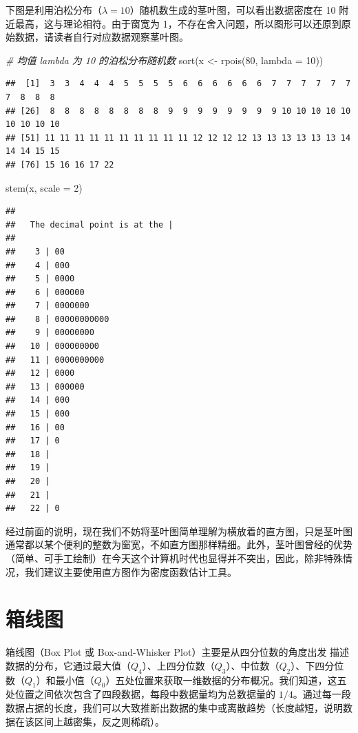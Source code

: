 \documentclass[
  b5paper,
  UTF8,twoside]{book}
\newenvironment{Shaded}{\begin{snugshade}}{\end{snugshade}}
\newcommand{\AttributeTok}[1]{\textcolor[rgb]{0.77,0.63,0.00}{#1}}
\newcommand{\CommentTok}[1]{\textcolor[rgb]{0.56,0.35,0.01}{\textit{#1}}}
\newcommand{\DecValTok}[1]{\textcolor[rgb]{0.00,0.00,0.81}{#1}}
\newcommand{\FunctionTok}[1]{\textcolor[rgb]{0.00,0.00,0.00}{#1}}
\newcommand{\NormalTok}[1]{#1}
\newcommand{\OtherTok}[1]{\textcolor[rgb]{0.56,0.35,0.01}{#1}}
\begin{document}
下图是利用泊松分布（\(\lambda=10\)）随机数生成的茎叶图，可以看出数据密度在 10 附近最高，这与理论相符。由于窗宽为 1，不存在舍入问题，所以图形可以还原到原始数据，请读者自行对应数据观察茎叶图。

\begin{Shaded}
\begin{Highlighting}[]
\CommentTok{\# 均值 lambda 为 10 的泊松分布随机数}
\FunctionTok{sort}\NormalTok{(x }\OtherTok{\textless{}{-}} \FunctionTok{rpois}\NormalTok{(}\DecValTok{80}\NormalTok{, }\AttributeTok{lambda =} \DecValTok{10}\NormalTok{))}
\end{Highlighting}
\end{Shaded}

\begin{verbatim}
##  [1]  3  3  4  4  4  5  5  5  5  6  6  6  6  6  6  7  7  7  7  7  7  7  8  8  8
## [26]  8  8  8  8  8  8  8  8  9  9  9  9  9  9  9  9 10 10 10 10 10 10 10 10 10
## [51] 11 11 11 11 11 11 11 11 11 11 12 12 12 12 13 13 13 13 13 13 14 14 14 15 15
## [76] 15 16 16 17 22
\end{verbatim}

\begin{Shaded}
\begin{Highlighting}[]
\FunctionTok{stem}\NormalTok{(x, }\AttributeTok{scale =} \DecValTok{2}\NormalTok{)}
\end{Highlighting}
\end{Shaded}

\begin{verbatim}
## 
##   The decimal point is at the |
## 
##    3 | 00
##    4 | 000
##    5 | 0000
##    6 | 000000
##    7 | 0000000
##    8 | 00000000000
##    9 | 00000000
##   10 | 000000000
##   11 | 0000000000
##   12 | 0000
##   13 | 000000
##   14 | 000
##   15 | 000
##   16 | 00
##   17 | 0
##   18 | 
##   19 | 
##   20 | 
##   21 | 
##   22 | 0
\end{verbatim}

经过前面的说明，现在我们不妨将茎叶图简单理解为横放着的直方图，只是茎叶图通常都以某个便利的整数为窗宽，不如直方图那样精细。此外，茎叶图曾经的优势（简单、可手工绘制）在今天这个计算机时代也显得并不突出，因此，除非特殊情况，我们建议主要使用直方图作为密度函数估计工具。

\hypertarget{sec:boxplot}{%
\section{箱线图}\label{sec:boxplot}}

箱线图（Box Plot 或 Box-and-Whisker Plot）主要是从四分位数的角度出发
描述数据的分布，它通过最大值（\(Q_4\)）、上四分位数（\(Q_3\)）、中位数（\(Q_2\)）、下四分位数（\(Q_1\)）和最小值（\(Q_0\)）五处位置来获取一维数据的分布概况。我们知道，这五处位置之间依次包含了四段数据，每段中数据量均为总数据量的 \(1/4\)。通过每一段数据占据的长度，我们可以大致推断出数据的集中或离散趋势（长度越短，说明数据在该区间上越密集，反之则稀疏）。
\end{document}
